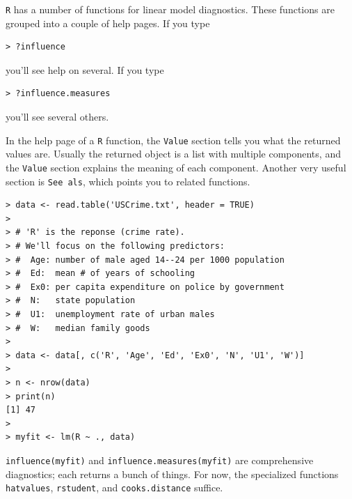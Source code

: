 \documentclass[12pt]{article}
\begin{document}
\verb+R+ has a number of functions for linear model diagnostics.
These functions are grouped into a couple of help pages.
If you type
\begin{verbatim}
> ?influence
\end{verbatim}
you'll see help on several.
If you type
\begin{verbatim}
> ?influence.measures
\end{verbatim}
you'll see several others.

In the help page of a \verb+R+ function,
the \verb+Value+ section tells you what the returned values are.
Usually the returned object is a list with multiple components,
and the \verb+Value+ section explains the meaning of each component.
Another very useful section is \verb+See als+,
which points you to related functions.

\begin{verbatim}
> data <- read.table('USCrime.txt', header = TRUE)
> 
> # 'R' is the reponse (crime rate).
> # We'll focus on the following predictors:
> #  Age: number of male aged 14--24 per 1000 population
> #  Ed:  mean # of years of schooling
> #  Ex0: per capita expenditure on police by government
> #  N:   state population
> #  U1:  unemployment rate of urban males
> #  W:   median family goods
> 
> data <- data[, c('R', 'Age', 'Ed', 'Ex0', 'N', 'U1', 'W')]
> 
> n <- nrow(data)
> print(n)
[1] 47
> 
> myfit <- lm(R ~ ., data)
\end{verbatim}


\verb+influence(myfit)+ and \verb+influence.measures(myfit)+
are comprehensive diagnostics; each returns a bunch of things.
For now, the specialized functions
\verb+hatvalues+, \verb+rstudent+, and \verb+cooks.distance+ suffice.
\end{document}
